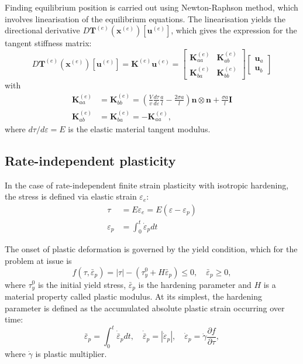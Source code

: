 Finding equilibrium position is carried out using Newton-Raphson method, which
involves linearisation of the equilibrium equations. The linearisation yields
the directional derivative \(D \bm{T}^{(e)} (\bm{x}^{(e)}) [\bm{u}^{(e)}]\),
which gives the
expression for the tangent stiffness matrix:
\begin{equation}
  D \bm{T}^{(e)} (\bm{x}^{(e)}) [\bm{u}^{(e)}] = \bm{K}^{(e)} \bm{u}^{(e)} =
  \begin{bmatrix}
    \bm{K}_{aa}^{(e)} & \bm{K}_{ab}^{(e)} \\
    \bm{K}_{ba}^{(e)} & \bm{K}_{bb}^{(e)}
  \end{bmatrix}
  \begin{bmatrix}
    \bm{u}_{a} \\
    \bm{u}_{b}
  \end{bmatrix}
\end{equation}
with
\begin{align}
  \bm{K}_{aa}^{(e)} &= \bm{K}_{bb}^{(e)} =\left( \frac{V}{v}
                      \frac{d \tau}{d \varepsilon} \frac{a}{l} -
                      \frac{2 \sigma a}{l} \right)
                      \bm{n} \otimes \bm{n} + \frac{\sigma a}{l} \bm{I} \\
  \bm{K}_{ab}^{(e)} &= \bm{K}_{ba}^{(e)} = - \bm{K}_{aa}^{(e)},
\end{align}
where \(d \tau / d \varepsilon = E\) is the elastic material tangent modulus.

\subsection{Rate-independent plasticity}
\label{sec:plasticity}

In the case of rate-independent finite strain plasticity with isotropic hardening,
the stress is defined via elastic strain \(\varepsilon_{e}\):
\begin{align}
  \tau &= E \varepsilon_{e} = E \left( \varepsilon - \varepsilon_{p} \right) \\
  \varepsilon_{p} &= \int_{0}^{t} \dot{\varepsilon}_{p} dt \label{eq:plastic-strain}
\end{align}

The onset of plastic deformation is governed by the yield condition, which for the
problem at issue is
\begin{equation}
  f (\tau, \bar{\varepsilon}_{p}) = \left| \tau \right| - \left(
    \tau_{y}^{0} + H \bar{\varepsilon}_{p} \right) \leq 0, \quad 
  \bar{\varepsilon}_{p} \geq 0, 
\end{equation}
where \(\tau_{y}^{0}\) is the initial yield stress,
\(\bar{\varepsilon}_{p}\) is the hardening parameter and \(H\) is a material
property called plastic modulus.
At its simplest, the hardening parameter is defined as the accumulated absolute
plastic strain occurring over time:
\begin{equation}
  \bar{\varepsilon}_{p} = \int_{0}^{t} \dot{\bar{\varepsilon}}_{p} dt,
  \quad \dot{\bar{\varepsilon}}_{p} = \left| \dot{\varepsilon}_{p} \right|,
  \quad \dot{\varepsilon}_{p} = \dot{\gamma} \frac{\partial f}{\partial \tau},
\end{equation}
where \(\dot{\gamma}\) is plastic multiplier.

